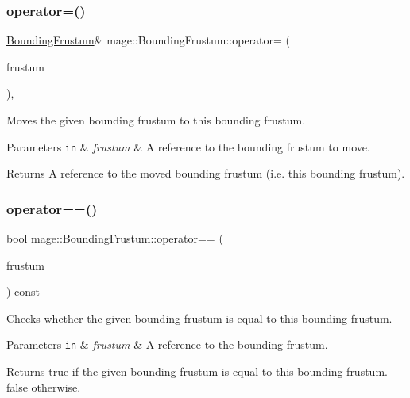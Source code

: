 \subsubsection{\texorpdfstring{operator=()}{operator=()}\hspace{0.1cm}{\footnotesize\ttfamily [2/2]}}
{\footnotesize\ttfamily \hyperlink{classmage_1_1_bounding_frustum}{Bounding\+Frustum}\& mage\+::\+Bounding\+Frustum\+::operator= (\begin{DoxyParamCaption}\item[{\hyperlink{classmage_1_1_bounding_frustum}{Bounding\+Frustum} \&\&}]{frustum }\end{DoxyParamCaption})\hspace{0.3cm}{\ttfamily [default]}, {\ttfamily [noexcept]}}

Moves the given bounding frustum to this bounding frustum.


\begin{DoxyParams}[1]{Parameters}
\mbox{\tt in}  & {\em frustum} & A reference to the bounding frustum to move. \\
\hline
\end{DoxyParams}
\begin{DoxyReturn}{Returns}
A reference to the moved bounding frustum (i.\+e. this bounding frustum). 
\end{DoxyReturn}
\hypertarget{classmage_1_1_bounding_frustum_a90c5a355878674b1320e195318703d4b}{}\label{classmage_1_1_bounding_frustum_a90c5a355878674b1320e195318703d4b} 
\subsubsection{\texorpdfstring{operator==()}{operator==()}}
{\footnotesize\ttfamily bool mage\+::\+Bounding\+Frustum\+::operator== (\begin{DoxyParamCaption}\item[{const \hyperlink{classmage_1_1_bounding_frustum}{Bounding\+Frustum} \&}]{frustum }\end{DoxyParamCaption}) const\hspace{0.3cm}{\ttfamily [noexcept]}}

Checks whether the given bounding frustum is equal to this bounding frustum.


\begin{DoxyParams}[1]{Parameters}
\mbox{\tt in}  & {\em frustum} & A reference to the bounding frustum. \\
\hline
\end{DoxyParams}
\begin{DoxyReturn}{Returns}
{\ttfamily true} if the given bounding frustum is equal to this bounding frustum. {\ttfamily false} otherwise. 
\end{DoxyReturn}
\hypertarget{classmage_1_1_bounding_frustum_a0fbd4639f1bd0a014430313410aa013d}{}\label{classmage_1_1_bounding_frustum_a0fbd4639f1bd0a014430313410aa013d} 
